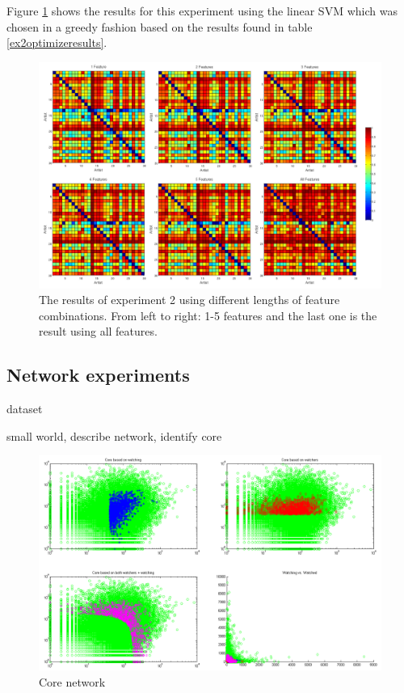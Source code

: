Figure \ref{fig:experiment2results} shows the results for this experiment using the linear SVM which was chosen in a greedy fashion based on the results found in table \ref{ex2optimizeresults}.

\begin{figure}[htb]
  \centering
  \includegraphics[width=1\linewidth]{img/experiment2results.png}
  \caption{The results of experiment 2 using different lengths of feature combinations. From left to right: 1-5 features and the last one is the result using all features.}
  \label{fig:experiment2results}
\end{figure}


\subsection{Network experiments}
dataset

small world, describe network, identify core

\begin{figure}[htb]
  \centering
  \includegraphics[width=1\linewidth]{img/core.png}
  \caption{Core network}
  \label{fig:results_core}
\end{figure}